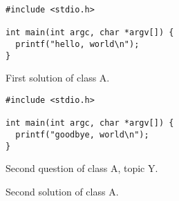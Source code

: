 \ifdef{\myboxa}{}{\newsavebox\myboxa}
\begin{lrbox}{\myboxa}\begin{minipage}{\textwidth}\begin{lstlisting}[]
#include <stdio.h>

int main(int argc, char *argv[]) {
  printf("hello, world\n");
}
\end{lstlisting}\end{minipage}\end{lrbox}
\begin{question}[class=A,ID=A3,topic=X]
\noindent\usebox\myboxa
\end{question}
\begin{solution}
First solution of class A.
\end{solution}

\begin{lrbox}{\myboxa}\begin{minipage}{\textwidth}\begin{lstlisting}[]
#include <stdio.h>

int main(int argc, char *argv[]) {
  printf("goodbye, world\n");
}
\end{lstlisting}\end{minipage}\end{lrbox}
\begin{question}[class=A,ID=A2,topic=Y]
Second question of class A, topic Y.
\\\noindent\usebox\myboxa
\end{question}
\begin{solution}
Second solution of class A.
\end{solution}
\endinput
